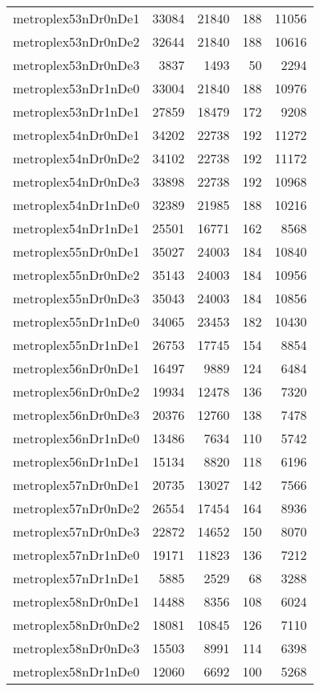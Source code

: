 \begin{longtable}{lrrrr}
metroplex53nDr0nDe1 & 33084 & 21840 & 188 & 11056 \\
metroplex53nDr0nDe2 & 32644 & 21840 & 188 & 10616 \\
metroplex53nDr0nDe3 & 3837 & 1493 & 50 & 2294 \\
metroplex53nDr1nDe0 & 33004 & 21840 & 188 & 10976 \\
metroplex53nDr1nDe1 & 27859 & 18479 & 172 & 9208 \\
metroplex54nDr0nDe1 & 34202 & 22738 & 192 & 11272 \\
metroplex54nDr0nDe2 & 34102 & 22738 & 192 & 11172 \\
metroplex54nDr0nDe3 & 33898 & 22738 & 192 & 10968 \\
metroplex54nDr1nDe0 & 32389 & 21985 & 188 & 10216 \\
metroplex54nDr1nDe1 & 25501 & 16771 & 162 & 8568 \\
metroplex55nDr0nDe1 & 35027 & 24003 & 184 & 10840 \\
metroplex55nDr0nDe2 & 35143 & 24003 & 184 & 10956 \\
metroplex55nDr0nDe3 & 35043 & 24003 & 184 & 10856 \\
metroplex55nDr1nDe0 & 34065 & 23453 & 182 & 10430 \\
metroplex55nDr1nDe1 & 26753 & 17745 & 154 & 8854 \\
metroplex56nDr0nDe1 & 16497 & 9889 & 124 & 6484 \\
metroplex56nDr0nDe2 & 19934 & 12478 & 136 & 7320 \\
metroplex56nDr0nDe3 & 20376 & 12760 & 138 & 7478 \\
metroplex56nDr1nDe0 & 13486 & 7634 & 110 & 5742 \\
metroplex56nDr1nDe1 & 15134 & 8820 & 118 & 6196 \\
metroplex57nDr0nDe1 & 20735 & 13027 & 142 & 7566 \\
metroplex57nDr0nDe2 & 26554 & 17454 & 164 & 8936 \\
metroplex57nDr0nDe3 & 22872 & 14652 & 150 & 8070 \\
metroplex57nDr1nDe0 & 19171 & 11823 & 136 & 7212 \\
metroplex57nDr1nDe1 & 5885 & 2529 & 68 & 3288 \\
metroplex58nDr0nDe1 & 14488 & 8356 & 108 & 6024 \\
metroplex58nDr0nDe2 & 18081 & 10845 & 126 & 7110 \\
metroplex58nDr0nDe3 & 15503 & 8991 & 114 & 6398 \\
metroplex58nDr1nDe0 & 12060 & 6692 & 100 & 5268 \\

\end{longtable}
